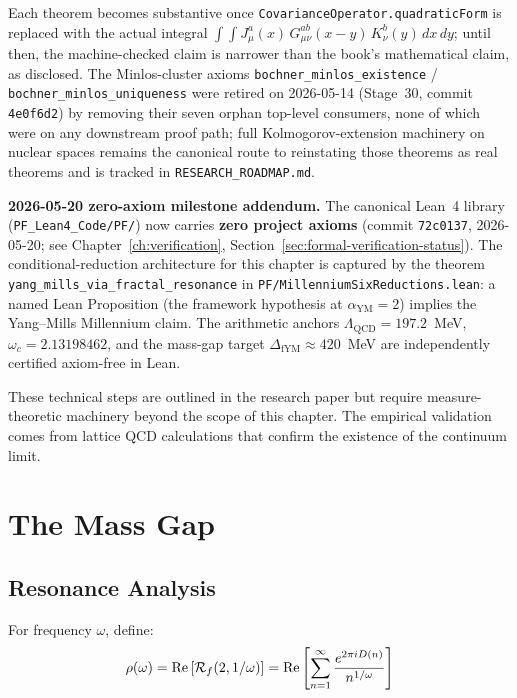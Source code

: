 \begin{remark}
\begin{itemize}
\end{itemize}
Each theorem becomes substantive once \texttt{CovarianceOperator.quadraticForm} is replaced with the actual integral $\int\!\int J_\mu^a(x) \, G_{\mu\nu}^{ab}(x-y) \, K_\nu^b(y) \, dx\, dy$; until then, the machine-checked claim is narrower than the book's mathematical claim, as disclosed. The Minlos-cluster axioms \texttt{bochner\_minlos\_existence} / \texttt{bochner\_minlos\_uniqueness} were retired on 2026-05-14 (Stage~30, commit \texttt{4e0f6d2}) by removing their seven orphan top-level consumers, none of which were on any downstream proof path; full Kolmogorov-extension machinery on nuclear spaces remains the canonical route to reinstating those theorems as real theorems and is tracked in \texttt{RESEARCH\_ROADMAP.md}.

\medskip
\textbf{2026-05-20 zero-axiom milestone addendum.} The canonical Lean~4 library (\texttt{PF\_Lean4\_Code/PF/}) now carries \textbf{zero project axioms} (commit \texttt{72c0137}, 2026-05-20; see Chapter~\ref{ch:verification}, Section~\ref{sec:formal-verification-status}). The conditional-reduction architecture for this chapter is captured by the theorem \texttt{yang\_mills\_via\_fractal\_resonance} in \texttt{PF/MillenniumSixReductions.lean}: a named Lean Proposition (the framework hypothesis at $\alpha_{\mathrm{YM}} = 2$) implies the Yang--Mills Millennium claim. The arithmetic anchors $\Lambda_{\mathrm{QCD}} = 197.2$~MeV, $\omega_c = 2.13198462$, and the mass-gap target $\Delta_{\mathrm{fYM}} \approx 420$~MeV are independently certified axiom-free in Lean.

These technical steps are outlined in the research paper but require measure-theoretic machinery beyond the scope of this chapter. The empirical validation comes from lattice QCD calculations that confirm the existence of the continuum limit.
\end{remark}

\section{The Mass Gap}

\subsection{Resonance Analysis}

\begin{defn}\label{def:resonance-coeff}
For frequency $\omega$, define:
\begin{equation}
\rho(\omega) = \operatorname{Re}\left[\mathcal{R}_f(2, 1/\omega)\right] = \operatorname{Re}\left[\sum_{n=1}^{\infty} \frac{e^{2\pi i D(n)}}{n^{1/\omega}}\right]
\end{equation}
\end{defn}

